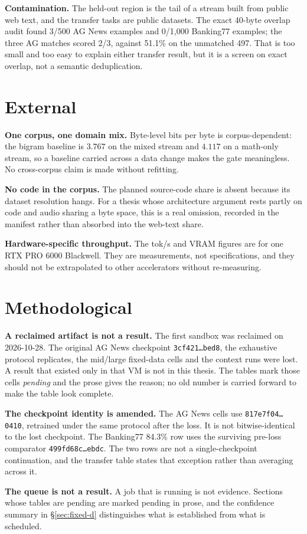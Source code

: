 \textbf{Contamination.} The held-out region is the tail of a stream built from
public web text, and the transfer tasks are public datasets. The exact 40-byte
overlap audit found 3/500 AG News examples and 0/1,000 Banking77 examples; the
three AG matches scored 2/3, against 51.1\% on the unmatched 497. That is too
small and too easy to explain either transfer result, but it is a screen on exact
overlap, not a semantic deduplication.

\section{External}

\textbf{One corpus, one domain mix.} Byte-level bits per byte is corpus-dependent:
the bigram baseline is $3.767$ on the mixed stream and $4.117$ on a math-only
stream, so a baseline carried across a data change makes the gate meaningless. No
cross-corpus claim is made without refitting.

\textbf{No code in the corpus.} The planned source-code share is absent because its
dataset resolution hangs. For a thesis whose architecture argument rests partly on
code and audio sharing a byte space, this is a real omission, recorded in the
manifest rather than absorbed into the web-text share.

\textbf{Hardware-specific throughput.} The tok/s and VRAM figures are for one RTX
PRO 6000 Blackwell. They are measurements, not specifications, and they should not
be extrapolated to other accelerators without re-measuring.

\section{Methodological}

\textbf{A reclaimed artifact is not a result.} The first sandbox was reclaimed on
2026-10-28. The original AG News checkpoint \texttt{3cf421\ldots bed8}, the
exhaustive protocol replicates, the mid/large fixed-data cells and the context
runs were lost. A result that existed only in that VM is not
in this thesis. The tables mark those cells \emph{pending} and the prose gives the
reason; no old number is carried forward to make the table look complete.

\textbf{The checkpoint identity is amended.} The AG News cells use
\texttt{817e7f04\ldots0410}, retrained under the same protocol after the loss. It is
not bitwise-identical to the lost checkpoint. The Banking77 84.3\% row uses the
surviving pre-loss comparator \texttt{499fd68c\ldots ebdc}. The two rows are not a
single-checkpoint continuation, and the transfer table states that exception
rather than averaging across it.

\textbf{The queue is not a result.} A job that is running is not evidence. Sections
whose tables are pending are marked pending in prose, and the confidence summary in
\S\ref{sec:fixed-d} distinguishes what is established from what is scheduled.
